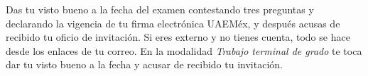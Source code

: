 \documentclass[11pt,a4paper]{article}
\begin{document}
{\small\tableofcontents}
\newpage
\begin{quevasahacer}
Das tu visto bueno a la fecha del examen contestando tres preguntas y declarando la vigencia de tu firma electrónica UAEMéx, y después acusas de recibido tu oficio de invitación. Si eres externo y no tienes cuenta, todo se hace desde los enlaces de tu correo. En la modalidad \emph{Trabajo terminal de grado} te toca dar tu visto bueno a la fecha y acusar de recibido tu invitación.
\end{quevasahacer}




\end{document}
